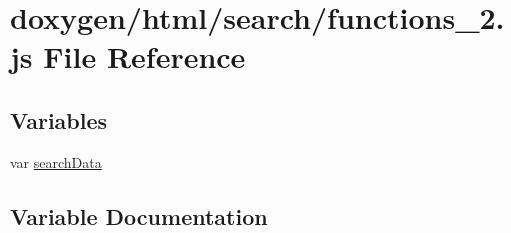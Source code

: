 \hypertarget{a00085}{}\section{doxygen/html/search/functions\+\_\+2.js File Reference}
\label{a00085}
\subsection*{Variables}
\begin{DoxyCompactItemize}
\item 
var \hyperlink{a00085_ad01a7523f103d6242ef9b0451861231e}{search\+Data}
\end{DoxyCompactItemize}


\subsection{Variable Documentation}
\hypertarget{a00085_ad01a7523f103d6242ef9b0451861231e}{}
